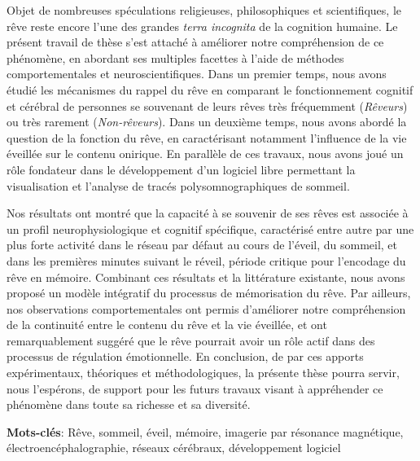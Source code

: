 Objet de nombreuses spéculations religieuses, philosophiques et scientifiques, le rêve reste encore l'une des grandes \emph{terra incognita} de la cognition humaine. Le présent travail de thèse s’est attaché à améliorer notre compréhension de ce phénomène, en abordant ses multiples facettes à l’aide de méthodes comportementales et neuroscientifiques. Dans un premier temps, nous avons étudié les mécanismes du rappel du rêve en comparant le fonctionnement cognitif et cérébral de personnes se souvenant de leurs rêves très fréquemment (\emph{Rêveurs}) ou très rarement (\emph{Non-rêveurs}). Dans un deuxième temps, nous avons abordé la question de la fonction du rêve, en caractérisant notamment l’influence de la vie éveillée sur le contenu onirique. En parallèle de ces travaux, nous avons joué un rôle fondateur dans le développement d’un logiciel libre permettant la visualisation et l’analyse de tracés polysomnographiques de sommeil.

Nos résultats ont montré que la capacité à se souvenir de ses rêves est associée à un profil neurophysiologique et cognitif spécifique, caractérisé entre autre par une plus forte activité dans le réseau par défaut au cours de l’éveil, du sommeil, et dans les premières minutes suivant le réveil, période critique pour l’encodage du rêve en mémoire. Combinant ces résultats et la littérature existante, nous avons proposé un modèle intégratif du processus de mémorisation du rêve. Par ailleurs, nos observations comportementales ont permis d’améliorer notre compréhension de la continuité entre le contenu du rêve et la vie éveillée, et ont remarquablement suggéré que le rêve pourrait avoir un rôle actif dans des processus de régulation émotionnelle. En conclusion, de par ces apports expérimentaux, théoriques et méthodologiques, la présente thèse pourra servir, nous l’espérons, de support pour les futurs travaux visant à appréhender ce phénomène dans toute sa richesse et sa diversité.

\textbf{Mots-clés}: Rêve, sommeil, éveil, mémoire, imagerie par résonance magnétique, électroencéphalographie, réseaux cérébraux, développement logiciel
